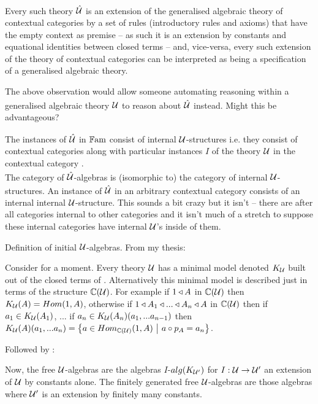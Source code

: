 {Every such theory $\hatU$ is an extension of the generalised algebraic theory of contextual categories
by a set of rules (introductory rules and axioms) that have  the empty context as premise -- as such it is an extension
by constants and equational identities between closed terms -- and, vice-versa, every such extension of
the theory of contextual categories can be interpreted as being a specification of a generalised algebraic theory.  

\begin{notebox}[Question]
The above observation would allow someone automating reasoning within  a generalised algebraic theory 
$\gatU$ to reason about $\hatU$ instead. Might this be advantageous? 
\end{notebox}

\note 
The instances of $\hatU$  in $\Fam$ consist of  internal $\gat[U]$-structures  i.e. they consist of contextual categories \catcw along with particular instances $I$ of
the theory $\gat[U]$ in the contextual category \catc. \\
The category of $\hatU$-algebras is (isomorphic to) the category of internal $\gatU$-structures.
\note
An instance of $\hatU$ in an arbitrary contextual category
consists of  an internal internal $\gat[U]$-structure. This sounds a bit crazy but it isn't -- there are after all categories internal to other categories and it isn't much of a stretch to suppose these internal categories have internal $\gat[U]$'s inside of them. 

\note 
Definition of initial $\gat[U]$-algebras. From my thesis:
\begin{tightquote}
Consider for a moment. Every theory $\gat[U]$ has a minimal model denoted $\KU$ built out of the closed terms of \gat[U]. Alternatively this minimal model is described just in terms of the structure $\CofU$. For example
if $1 \base A$ in $\CofU$ then 
$\KU(A)=Hom(1,A)$, otherwise if $1 \base A_1 \base ... \base A_n \base A$ in $\CofU$
then if $a_1 \in \KU(A_1)$, ... if $a_n \in \KU(A_n)(a_1,...a_{n-1})$ then 
$\KU(A)(a_1,...a_n)=\setsuchthat{a\in Hom_{\CofU}(1,A)}{a \circ p_A = a_n}$. \\
\end{tightquote} 

Followed by :
\begin{tightquote}
Now, the free $\gat[U]$-algebras are the algebras $I$-$alg(\KUp)$ for $I: \gat[U] \morph \gat[U']$ an extension of $\gat[U]$ by constants alone. The finitely generated free $\gat[U]$-algebras are those algebras where $\gat[U']$ is an extension by finitely many constants. \\
\end{tightquote}

}
